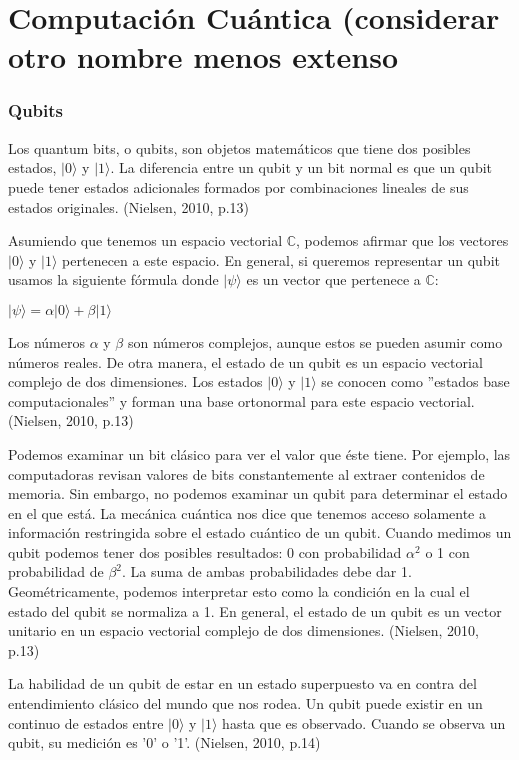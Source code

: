 \documentclass[11pt,a4paper]{article}
\begin{document}
\part{Computación Cuántica (considerar otro nombre menos extenso}
\section*{Qubits}

Los quantum bits, o qubits, son objetos matemáticos que tiene dos posibles estados,  $\vert 0\rangle$ y $\vert 1\rangle$. La diferencia entre un qubit y un bit normal es que un qubit puede tener estados adicionales formados por combinaciones lineales de sus estados originales. (Nielsen, 2010, p.13)

Asumiendo que tenemos un espacio vectorial $\mathbb{C}$, podemos afirmar que los vectores $\vert 0\rangle$ y $\vert 1\rangle$ pertenecen a este espacio. En general, si queremos representar un qubit usamos la siguiente fórmula donde $\vert \psi \rangle$ es un vector que pertenece a $\mathbb{C}$:

\begin{center}
$\vert \psi \rangle = \alpha \vert 0\rangle + \beta \vert 1\rangle$
\end{center}

Los números $\alpha$ y $\beta$ son números complejos, aunque estos se pueden asumir como números reales. De otra manera, el estado de un qubit es un espacio vectorial complejo de dos dimensiones. Los estados $\vert 0\rangle$ y $\vert 1\rangle$ se conocen como ''estados base computacionales'' y forman una base ortonormal para este espacio vectorial. (Nielsen, 2010, p.13)

Podemos examinar un bit clásico para ver el valor que éste tiene. Por ejemplo, las computadoras revisan valores de bits constantemente al extraer contenidos de memoria. Sin embargo, no podemos examinar un qubit para determinar el estado en el que está. La mecánica cuántica nos dice que tenemos acceso solamente a información restringida sobre el estado cuántico de un qubit. Cuando medimos un qubit podemos tener dos posibles resultados: 0 con probabilidad $\alpha^2$ o 1 con probabilidad de $\beta^2$. La suma de ambas probabilidades debe dar 1. Geométricamente, podemos interpretar esto como la condición en la cual el estado del qubit se normaliza a 1. En general, el estado de un qubit es un vector unitario en un espacio vectorial complejo de dos dimensiones.  (Nielsen, 2010, p.13)

La habilidad de un qubit de estar en un estado superpuesto va en contra del entendimiento clásico del mundo que nos rodea. Un qubit puede existir en un continuo de estados entre $\vert 0\rangle$ y $\vert 1\rangle$ hasta que es observado. Cuando se observa un qubit, su medición es '0' o '1'. (Nielsen, 2010, p.14)
\end{document}
